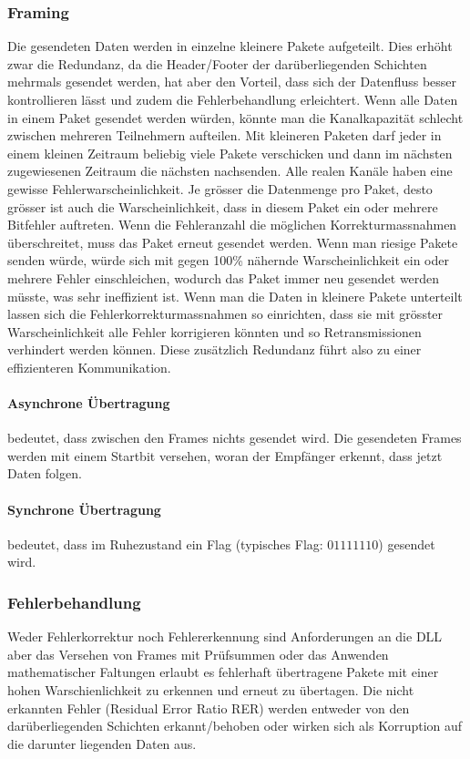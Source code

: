 \documentclass{article}
\begin{document}
\subsubsection{Framing}
Die gesendeten Daten werden in einzelne kleinere Pakete aufgeteilt. Dies erhöht zwar die Redundanz, da die Header/Footer der darüberliegenden Schichten mehrmals gesendet werden, hat aber den Vorteil, dass sich der Datenfluss besser kontrollieren lässt und zudem die Fehlerbehandlung erleichtert. Wenn alle Daten in einem Paket gesendet werden würden, könnte man die Kanalkapazität schlecht zwischen mehreren Teilnehmern aufteilen. Mit kleineren Paketen darf jeder in einem kleinen Zeitraum beliebig viele Pakete verschicken und dann im nächsten zugewiesenen Zeitraum die nächsten nachsenden. Alle realen Kanäle haben eine gewisse Fehlerwarscheinlichkeit. Je grösser die Datenmenge pro Paket, desto grösser ist auch die Warscheinlichkeit, dass in diesem Paket ein oder mehrere Bitfehler auftreten. Wenn die Fehleranzahl die möglichen Korrekturmassnahmen überschreitet, muss das Paket erneut gesendet werden. Wenn man riesige Pakete senden würde, würde sich mit gegen 100\% nähernde Warscheinlichkeit ein oder mehrere Fehler einschleichen, wodurch das Paket immer neu gesendet werden müsste, was sehr ineffizient ist. Wenn man die Daten in kleinere Pakete unterteilt lassen sich die Fehlerkorrekturmassnahmen so einrichten, dass sie mit grösster Warscheinlichkeit alle Fehler korrigieren könnten und so Retransmissionen verhindert werden können. Diese zusätzlich Redundanz führt also zu einer effizienteren Kommunikation.
\paragraph{Asynchrone Übertragung} bedeutet, dass zwischen den Frames nichts gesendet wird. Die gesendeten Frames werden mit einem Startbit versehen, woran der Empfänger erkennt, dass jetzt Daten folgen.
\paragraph{Synchrone Übertragung} bedeutet, dass im Ruhezustand ein Flag (typisches Flag: $01111110$) gesendet wird.
\subsubsection{Fehlerbehandlung}
Weder Fehlerkorrektur noch Fehlererkennung sind Anforderungen an die DLL aber das Versehen von Frames mit Prüfsummen oder das Anwenden mathematischer Faltungen erlaubt es fehlerhaft übertragene Pakete mit einer hohen Warschienlichkeit zu erkennen und erneut zu übertagen. Die nicht erkannten Fehler (Residual Error Ratio RER) werden entweder von den darüberliegenden Schichten erkannt/behoben oder wirken sich als Korruption auf die darunter liegenden Daten aus.
\end{document}
